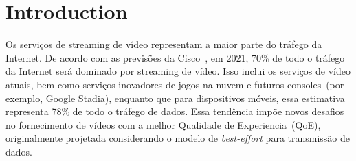 \section{Introduction}
\label{ch:introduction}


\vspace{0.5cm}

Os serviços de streaming de vídeo representam a maior parte do tráfego da Internet. De acordo com as previsões da Cisco~\cite{cisco:forecast},
em 2021, 70\% de todo o tráfego da Internet será dominado por streaming de vídeo. Isso inclui os serviços de vídeo atuais, bem como serviços inovadores de jogos na nuvem e futuros consoles~(por exemplo, Google Stadia), enquanto que para dispositivos móveis, essa estimativa representa 78\% de todo o tráfego de dados. Essa tendência impõe novos desafios no fornecimento de vídeos com a melhor Qualidade de Experiencia~(QoE), originalmente projetada considerando o modelo de \textit{best-effort} para transmissão de dados.




